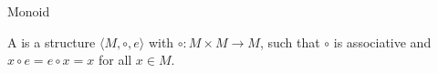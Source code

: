 \documentclass{stex}
\begin{document}
\begin{smodule}{Monoid}
  \begin{definition}
    A \textbf{} is a structure
    $\langle M,\circ,e\rangle$ with $\circ:M\times M\to M$, such 
    that $\circ$ is associative and $x\circ e=e\circ x=x$ for all 
    $x\in M$.
  \end{definition}
\end{smodule}
\end{document}
